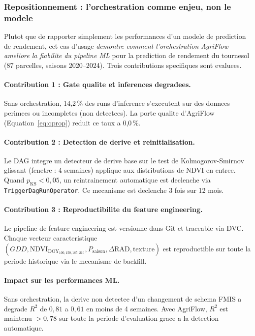 \documentclass[12pt,a4paper]{article}
\theoremstyle{plain}
\theoremstyle{definition}
\theoremstyle{remark}
\begin{document}
\subsubsection{Repositionnement : l'orchestration comme enjeu, non le modele}

Plutot que de rapporter simplement les performances d'un modele de
prediction de rendement, cet cas d'usage \emph{demontre comment
l'orchestration AgriFlow ameliore la fiabilite du pipeline ML}
pour la prediction de rendement du tournesol (87 parcelles,
saisons 2020--2024). Trois contributions specifiques sont evaluees.

\paragraph{Contribution 1 : Gate qualite et inferences degradees.}
Sans orchestration, 14,2\,\% des runs d'inference s'executent sur
des donnees perimees ou incompletes (non detectees). La porte qualite
d'AgriFlow (Equation~\ref{eq:qprop}) reduit ce taux a 0,0\,\%.

\paragraph{Contribution 2 : Detection de derive et reinitialisation.}
Le DAG integre un detecteur de derive base sur le test de
Kolmogorov-Smirnov glissant (fenetre : 4 semaines) applique aux
distributions de NDVI en entree. Quand $p_{\text{KS}} < 0{,}05$,
un reintrainement automatique est declenche via
\texttt{TriggerDagRunOperator}. Ce mecanisme est declenche 3 fois
sur 12 mois.

\paragraph{Contribution 3 : Reproductibilite du feature engineering.}
Le pipeline de feature engineering est versionne dans Git et
traceable via DVC. Chaque vecteur caracteristique
$(GDD, \text{NDVI}_{\text{DOY}_{100,150,185,210}},
P_{\text{saison}}, \Delta\text{RAD}, \text{texture})$
est reproductible sur toute la periode historique via le
mecanisme de backfill.

\paragraph{Impact sur les performances ML.}
Sans orchestration, la derive non detectee d'un changement de schema
FMIS a degrade $R^2$ de $0{,}81$ a $0{,}61$ en moins de 4 semaines.
Avec AgriFlow, $R^2$ est maintenu $> 0{,}78$ sur toute la periode
d'evaluation grace a la detection automatique.
\end{document}
